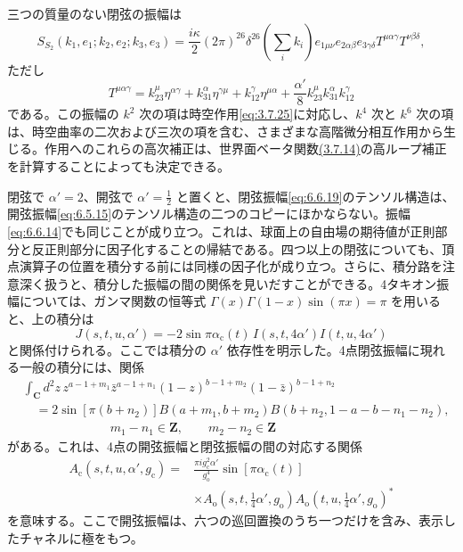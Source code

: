 三つの質量のない閉弦の振幅は
\begin{equation}
S_{S_2}(k_1,e_1;k_2,e_2;k_3,e_3)
=\frac{i\kappa}2(2\pi)^{26}\delta^{26}\left(\sum_i k_i\right)
e_{1\mu\nu}e_{2\alpha\beta}e_{3\gamma\delta}
T^{\mu\alpha\gamma}T^{\nu\beta\delta},
\tag{6.6.19}\label{eq:6.6.19}
\end{equation}
ただし
\begin{equation}
T^{\mu\alpha\gamma}
=k_{23}^\mu\eta^{\alpha\gamma}
+k_{31}^\alpha\eta^{\gamma\mu}
+k_{12}^\gamma\eta^{\mu\alpha}
+\frac{\alpha'}8k_{23}^\mu k_{31}^\alpha k_{12}^\gamma
\tag{6.6.20}\label{eq:6.6.20}
\end{equation}
である。この振幅の $k^2$ 次の項は時空作用\eqref{eq:3.7.25}に対応し、$k^4$ 次と $k^6$ 次の項は、時空曲率の二次および三次の項を含む、さまざまな高階微分相互作用から生じる。作用へのこれらの高次補正は、世界面ベータ関数\hyperref[eq:3.7.14a]{(3.7.14)}の高ループ補正を計算することによっても決定できる。

閉弦で $\alpha'=2$、開弦で $\alpha'=\tfrac12$ と置くと、閉弦振幅\eqref{eq:6.6.19}のテンソル構造は、開弦振幅\eqref{eq:6.5.15}のテンソル構造の二つのコピーにほかならない。振幅\eqref{eq:6.6.14}でも同じことが成り立つ。これは、球面上の自由場の期待値が正則部分と反正則部分に因子化することの帰結である。四つ以上の閉弦についても、頂点演算子の位置を積分する前には同様の因子化が成り立つ。さらに、積分路を注意深く扱うと、積分した振幅の間の関係を見いだすことができる。4タキオン振幅については、ガンマ関数の恒等式 $\Gamma(x)\Gamma(1-x)\sin(\pi x)=\pi$ を用いると、上の積分は
\begin{equation}
J(s,t,u,\alpha')=-2\sin\pi\alpha_{\mathrm c}(t)\,
I(s,t,4\alpha')I(t,u,4\alpha')
\tag{6.6.21}\label{eq:6.6.21}
\end{equation}
と関係付けられる。ここでは積分の $\alpha'$ 依存性を明示した。4点閉弦振幅に現れる一般の積分には、関係
\begin{equation}
\begin{aligned}
&\int_{\mathbf C}d^2z\,
z^{a-1+m_1}\bar z^{a-1+n_1}
(1-z)^{b-1+m_2}(1-\bar z)^{b-1+n_2}\\
&\quad=2\sin[\pi(b+n_2)]B(a+m_1,b+m_2)
B(b+n_2,1-a-b-n_1-n_2),\\
&\hspace{7em}m_1-n_1\in\mathbf Z,\qquad m_2-n_2\in\mathbf Z
\end{aligned}
\tag{6.6.22}\label{eq:6.6.22}
\end{equation}
がある。これは、4点の開弦振幅と閉弦振幅の間の対応する関係
\begin{equation}
\begin{aligned}
A_{\mathrm c}(s,t,u,\alpha',g_{\mathrm c})
={}&\frac{\pi i g_{\mathrm c}^2\alpha'}{g_{\mathrm o}^4}
\sin[\pi\alpha_{\mathrm c}(t)]\\
&\times A_{\mathrm o}(s,t,\tfrac14\alpha',g_{\mathrm o})
A_{\mathrm o}(t,u,\tfrac14\alpha',g_{\mathrm o})^*
\end{aligned}
\tag{6.6.23}\label{eq:6.6.23}
\end{equation}
を意味する。ここで開弦振幅は、六つの巡回置換のうち一つだけを含み、表示したチャネルに極をもつ。

